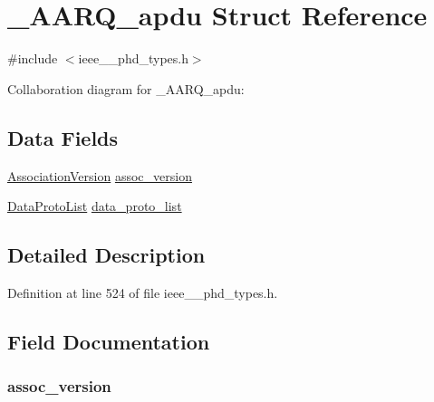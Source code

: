 \hypertarget{struct___a_a_r_q__apdu}{}\section{\+\_\+\+A\+A\+R\+Q\+\_\+apdu Struct Reference}
\label{struct___a_a_r_q__apdu}


{\ttfamily \#include $<$ieee\+\_\+\_\+phd\+\_\+types.\+h$>$}



Collaboration diagram for \+\_\+\+A\+A\+R\+Q\+\_\+apdu\+:
\subsection*{Data Fields}
\begin{DoxyCompactItemize}
\item 
\hyperlink{ieee__11073__phd__types_8h_af6658712394827aa71fdc23894ca1486}{Association\+Version} \hyperlink{struct___a_a_r_q__apdu_a0259a9e22b434d0f6c1e89080cb6f63c}{assoc\+\_\+version}
\item 
\hyperlink{ieee__11073__phd__types_8h_a5924abcfa2e2634dea5cff83260629b9}{Data\+Proto\+List} \hyperlink{struct___a_a_r_q__apdu_aeb3588fffc08c980254b2edd07a8ef74}{data\+\_\+proto\+\_\+list}
\end{DoxyCompactItemize}


\subsection{Detailed Description}


Definition at line 524 of file ieee\+\_\+\_\+phd\+\_\+types.\+h.



\subsection{Field Documentation}
\hypertarget{struct___a_a_r_q__apdu_a0259a9e22b434d0f6c1e89080cb6f63c}{}
\subsubsection[{assoc\+\_\+version}]{ assoc\+\_\+version}\label{struct___a_a_r_q__apdu_a0259a9e22b434d0f6c1e89080cb6f63c}


